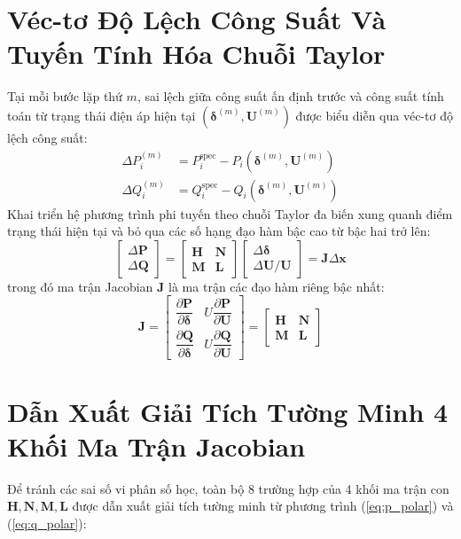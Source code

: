 \documentclass[12pt,a4paper,oneside]{report}
\begin{document}
\section{Véc-tơ Độ Lệch Công Suất Và Tuyến Tính Hóa Chuỗi Taylor}
Tại mỗi bước lặp thứ $m$, sai lệch giữa công suất ấn định trước và công suất tính toán từ trạng thái điện áp hiện tại $(\boldsymbol{\delta}^{(m)}, \mathbf{U}^{(m)})$ được biểu diễn qua véc-tơ độ lệch công suất:
\begin{align}
\Delta P_i^{(m)} &= P_i^{\text{spec}} - P_i(\boldsymbol{\delta}^{(m)}, \mathbf{U}^{(m)}) \\
\Delta Q_i^{(m)} &= Q_i^{\text{spec}} - Q_i(\boldsymbol{\delta}^{(m)}, \mathbf{U}^{(m)})
\end{align}
Khai triển hệ phương trình phi tuyến theo chuỗi Taylor đa biến xung quanh điểm trạng thái hiện tại và bỏ qua các số hạng đạo hàm bậc cao từ bậc hai trở lên:
\begin{equation}
\begin{bmatrix}
\Delta \mathbf{P} \\
\Delta \mathbf{Q}
\end{bmatrix}
=
\begin{bmatrix}
\mathbf{H} & \mathbf{N} \\
\mathbf{M} & \mathbf{L}
\end{bmatrix}
\begin{bmatrix}
\Delta \boldsymbol{\delta} \\
\Delta \mathbf{U} / \mathbf{U}
\end{bmatrix}
= \mathbf{J} \Delta \mathbf{x}
\end{equation}
trong đó ma trận Jacobian $\mathbf{J}$ là ma trận các đạo hàm riêng bậc nhất:
\begin{equation}
\mathbf{J} =
\begin{bmatrix}
\dfrac{\partial \mathbf{P}}{\partial \boldsymbol{\delta}} & U \dfrac{\partial \mathbf{P}}{\partial \mathbf{U}} \\[10pt]
\dfrac{\partial \mathbf{Q}}{\partial \boldsymbol{\delta}} & U \dfrac{\partial \mathbf{Q}}{\partial \mathbf{U}}
\end{bmatrix}
=
\begin{bmatrix}
\mathbf{H} & \mathbf{N} \\
\mathbf{M} & \mathbf{L}
\end{bmatrix}
\end{equation}

\section{Dẫn Xuất Giải Tích Tường Minh 4 Khối Ma Trận Jacobian}
Để tránh các sai số vi phân số học, toàn bộ 8 trường hợp của 4 khối ma trận con $\mathbf{H}, \mathbf{N}, \mathbf{M}, \mathbf{L}$ được dẫn xuất giải tích tường minh từ phương trình (\ref{eq:p_polar}) và (\ref{eq:q_polar}):
\end{document}
